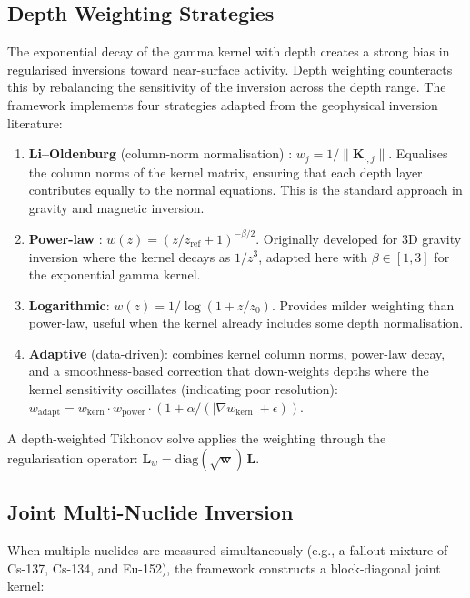 \documentclass[a4paper,11pt]{article}
\begin{document}
\subsection{Depth Weighting Strategies}

The exponential decay of the gamma kernel with depth creates a strong
bias in regularised inversions toward near-surface activity.  Depth
weighting counteracts this by rebalancing the sensitivity of the
inversion across the depth range.  The framework implements four
strategies adapted from the geophysical inversion literature:

\begin{enumerate}[label=\textbf{W\arabic*:}]
  \item \textbf{Li--Oldenburg} (column-norm normalisation) \citep{li19963d}:
  $w_j = 1/\|\bm{K}_{\cdot,j}\|$.  Equalises the column norms of the
  kernel matrix, ensuring that each depth layer contributes equally to
  the normal equations.  This is the standard approach in gravity and
  magnetic inversion.

  \item \textbf{Power-law} \citep{li19983d}:
  $w(z) = (z/z_{\mathrm{ref}} + 1)^{-\beta/2}$.
  Originally developed for 3D gravity inversion where the kernel
  decays as $1/z^3$, adapted here with $\beta \in [1, 3]$ for the
  exponential gamma kernel.

  \item \textbf{Logarithmic}: $w(z) = 1/\log(1 + z/z_0)$.
  Provides milder weighting than power-law, useful when the kernel
  already includes some depth normalisation.

  \item \textbf{Adaptive} (data-driven): combines kernel column norms,
  power-law decay, and a smoothness-based correction that down-weights
  depths where the kernel sensitivity oscillates (indicating poor
  resolution):
  $w_{\mathrm{adapt}} = w_{\mathrm{kern}} \cdot w_{\mathrm{power}} \cdot (1 + \alpha / (|\nabla w_{\mathrm{kern}}| + \epsilon))$.
\end{enumerate}

A depth-weighted Tikhonov solve applies the weighting through the
regularisation operator: $\bm{L}_w = \mathrm{diag}(\sqrt{\bm{w}})\,\bm{L}$.

\subsection{Joint Multi-Nuclide Inversion}

When multiple nuclides are measured simultaneously (e.g., a fallout
mixture of Cs-137, Cs-134, and Eu-152), the framework constructs a
block-diagonal joint kernel:
\end{document}
